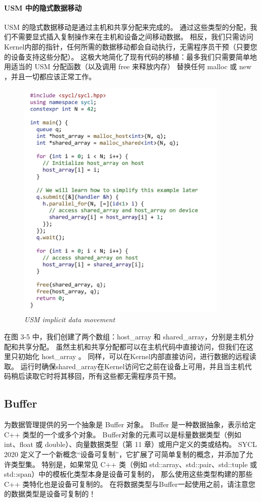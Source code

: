 \paragraph{USM 中的隐式数据移动}

USM 的隐式数据移动是通过主机和共享分配来完成的。 
通过这些类型的分配，我们不需要显式插入复制操作来在主机和设备之间移动数据。 
相反，我们只需访问Kernel内部的指针，任何所需的数据移动都会自动执行，无需程序员干预（只要您的设备支持这些分配）。 
这极大地简化了现有代码的移植：最多我们只需要简单地用适当的 USM 分配函数（以及调用 free 来释放内存）
替换任何 malloc 或 new ，并且一切都应该正常工作。

\begin{figure}[H]
	\centering
	\includegraphics[width=0.9\textwidth]{figs/F3.5.png}
	\caption{\textit{USM implicit data movement}}
\end{figure}

在图 3-5 中，我们创建了两个数组：host\_array 和 shared\_array，分别是主机分配和共享分配。 
虽然主机和共享分配都可以在主机代码中直接访问，但我们在这里只初始化 host\_array 。 
同样，可以在Kernel内部直接访问，进行数据的远程读取。 
运行时确保shared\_array在Kernel访问它之前在设备上可用，并且当主机代码稍后读取它时将其移回，所有这些都无需程序员干预。

\subsection{Buffer}
为数据管理提供的另一个抽象是 Buffer 对象。 Buffer 是一种数据抽象，表示给定 C++ 类型的一个或多个对象。 
Buffer对象的元素可以是标量数据类型（例如 int、float 或 double）、向量数据类型（第 11 章）或用户定义的类或结构。 
SYCL 2020 定义了一个新概念“设备可复制”，它扩展了可简单复制的概念，并添加了允许类型集。 
特别是，如果常见 C++ 类（例如 std::array、std::pair、std::tuple 或 std::span）中的模板化类型本身是设备可复制的，
那么使用这些类型构建的那些 C++ 类特化也是设备可复制的。 
在将数据类型与Buffer一起使用之前，请注意您的数据类型是设备可复制的！


